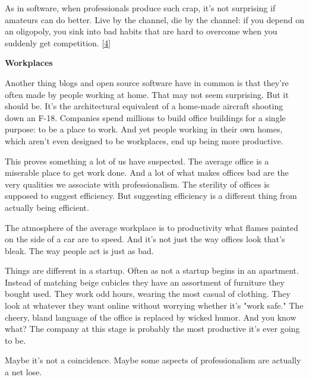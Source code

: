 As in software, when
                  professionals produce such crap, it's not surprising if
                  amateurs can do better. Live by the channel, die by the
                  channel: if you depend on an oligopoly, you sink into bad
                  habits that are hard to overcome when you suddenly get
                  competition.
                  [\href{\#f4n}{4}]

\textbf{Workplaces}

Another thing blogs
                  and open source software have in common is that they're often
                  made by people working at home. That may not seem surprising.
                  But it should be. It's the architectural equivalent of a
                  home-made aircraft shooting down an F-18. Companies spend
                  millions to build office buildings for a single purpose: to be
                  a place to work. And yet people working in their own homes,
                  which aren't even designed to be workplaces, end up being more
                  productive.

This proves something a lot of us have
                  suspected. The average office is a miserable place to get work
                  done. And a lot of what makes offices bad are the very
                  qualities we associate with professionalism. The sterility of
                  offices is supposed to suggest efficiency. But suggesting
                  efficiency is a different thing from actually being
                  efficient.

The atmosphere of the average workplace
                  is to productivity what flames painted on the side of a car
                  are to speed. And it's not just the way offices look that's
                  bleak. The way people act is just as bad.

Things
                  are different in a startup. Often as not a startup begins in
                  an apartment. Instead of matching beige cubicles they have an
                  assortment of furniture they bought used. They work odd hours,
                  wearing the most casual of clothing. They look at whatever
                  they want online without worrying whether it's "work safe."
                  The cheery, bland language of the office is replaced by wicked
                  humor. And you know what? The company at this stage is
                  probably the most productive it's ever going to be.

Maybe
                  it's not a coincidence. Maybe some aspects of professionalism
                  are actually a net lose.


